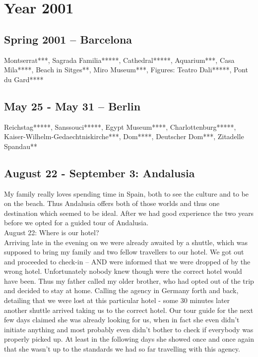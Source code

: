 \chapter{Year 2001}
\label{2001}

\section{Spring 2001 -- Barcelona}
\label{2001:Barcelona}

Montserrat***, Sagrada Familia*****, Cathedral*****, Aquarium***, Casa Mila****, Beach in Sitges**, Miro Museum***, Figures: Teatro Dali*****, Pont du Gard****

\section{May 25 - May 31 -- Berlin}
\label{2001:Berlin}

Reichstag*****, Sanssouci*****, Egypt Museum****, Charlottenburg*****, Kaiser-Wilhelm-Gedaechtniskirche***, Dom****, Deutscher Dom***, Zitadelle Spandau**

\section{August 22 - September 3: Andalusia}
\label{2001:Andalusia}

My family really loves spending time in Spain, both to see the culture and to be on the beach. Thus Andalusia offers both of those worlds and thus one destination which seemed to be ideal. After we had good experience the two years before we opted for a guided tour of Andalusia.\\

August 22: Where is our hotel?\\
Arriving late in the evening on we were already awaited by a shuttle, which was supposed to bring my family and two fellow travellers to our hotel. We got out and proceeded to check-in -- AND were informed that we were dropped of by the wrong hotel. Unfortunately nobody knew though were the correct hotel would have been. Thus my father called my older brother, who had opted out of the trip and decided to stay at home. Calling the agency in Germany forth and back, detailing that we were lost at this particular hotel - some 30 minutes later another shuttle arrived taking us to the correct hotel. Our tour guide for the next few days claimed she was already looking for us, when in fact she even didn't initiate anything and most probably even didn't bother to check if everybody was properly picked up. At least in the following days she showed once and once again that she wasn't up to the standards we had so far travelling with this agency.\\

